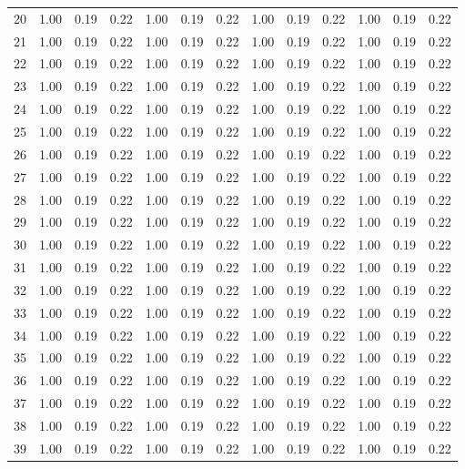\begin{landscape}
\begin{center}
\begin{longtable}{|c|c|c|c|c|c|c|c|c|c|c|c|c|}
20 & 1.00 & 0.19 & 0.22 & 1.00 & 0.19 & 0.22 & 1.00 & 0.19 & 0.22 & 1.00 & 0.19 & 0.22 \\
21 & 1.00 & 0.19 & 0.22 & 1.00 & 0.19 & 0.22 & 1.00 & 0.19 & 0.22 & 1.00 & 0.19 & 0.22 \\
22 & 1.00 & 0.19 & 0.22 & 1.00 & 0.19 & 0.22 & 1.00 & 0.19 & 0.22 & 1.00 & 0.19 & 0.22 \\
23 & 1.00 & 0.19 & 0.22 & 1.00 & 0.19 & 0.22 & 1.00 & 0.19 & 0.22 & 1.00 & 0.19 & 0.22 \\
24 & 1.00 & 0.19 & 0.22 & 1.00 & 0.19 & 0.22 & 1.00 & 0.19 & 0.22 & 1.00 & 0.19 & 0.22 \\
25 & 1.00 & 0.19 & 0.22 & 1.00 & 0.19 & 0.22 & 1.00 & 0.19 & 0.22 & 1.00 & 0.19 & 0.22 \\
26 & 1.00 & 0.19 & 0.22 & 1.00 & 0.19 & 0.22 & 1.00 & 0.19 & 0.22 & 1.00 & 0.19 & 0.22 \\
27 & 1.00 & 0.19 & 0.22 & 1.00 & 0.19 & 0.22 & 1.00 & 0.19 & 0.22 & 1.00 & 0.19 & 0.22 \\
28 & 1.00 & 0.19 & 0.22 & 1.00 & 0.19 & 0.22 & 1.00 & 0.19 & 0.22 & 1.00 & 0.19 & 0.22 \\
29 & 1.00 & 0.19 & 0.22 & 1.00 & 0.19 & 0.22 & 1.00 & 0.19 & 0.22 & 1.00 & 0.19 & 0.22 \\
30 & 1.00 & 0.19 & 0.22 & 1.00 & 0.19 & 0.22 & 1.00 & 0.19 & 0.22 & 1.00 & 0.19 & 0.22 \\
31 & 1.00 & 0.19 & 0.22 & 1.00 & 0.19 & 0.22 & 1.00 & 0.19 & 0.22 & 1.00 & 0.19 & 0.22 \\
32 & 1.00 & 0.19 & 0.22 & 1.00 & 0.19 & 0.22 & 1.00 & 0.19 & 0.22 & 1.00 & 0.19 & 0.22 \\
33 & 1.00 & 0.19 & 0.22 & 1.00 & 0.19 & 0.22 & 1.00 & 0.19 & 0.22 & 1.00 & 0.19 & 0.22 \\
34 & 1.00 & 0.19 & 0.22 & 1.00 & 0.19 & 0.22 & 1.00 & 0.19 & 0.22 & 1.00 & 0.19 & 0.22 \\
35 & 1.00 & 0.19 & 0.22 & 1.00 & 0.19 & 0.22 & 1.00 & 0.19 & 0.22 & 1.00 & 0.19 & 0.22 \\
36 & 1.00 & 0.19 & 0.22 & 1.00 & 0.19 & 0.22 & 1.00 & 0.19 & 0.22 & 1.00 & 0.19 & 0.22 \\
37 & 1.00 & 0.19 & 0.22 & 1.00 & 0.19 & 0.22 & 1.00 & 0.19 & 0.22 & 1.00 & 0.19 & 0.22 \\
38 & 1.00 & 0.19 & 0.22 & 1.00 & 0.19 & 0.22 & 1.00 & 0.19 & 0.22 & 1.00 & 0.19 & 0.22 \\
39 & 1.00 & 0.19 & 0.22 & 1.00 & 0.19 & 0.22 & 1.00 & 0.19 & 0.22 & 1.00 & 0.19 & 0.22 \\

\end{longtable}
\end{center}
\end{landscape}
